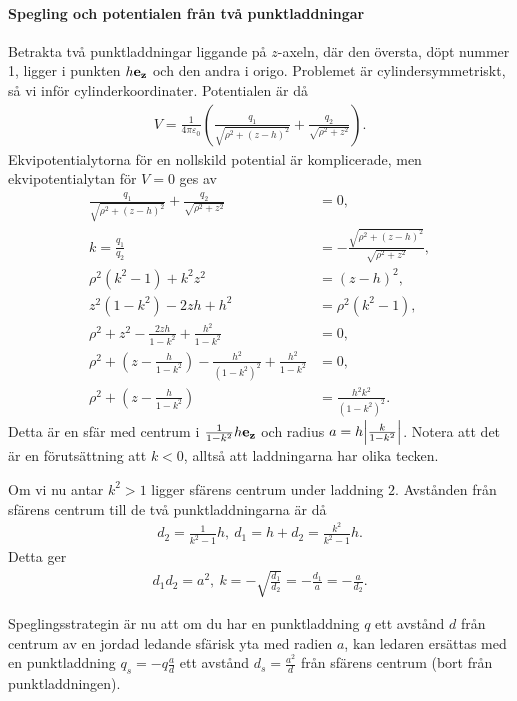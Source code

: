 \paragraph{Spegling och potentialen från två punktladdningar}
Betrakta två punktladdningar liggande på $z$-axeln, där den översta, döpt nummer 1, ligger i punkten $h\vb{e}_{\vb{z}}$ och den andra i origo. Problemet är cylindersymmetriskt, så vi inför cylinderkoordinater. Potentialen är då
\begin{align*}
	V = \frac{1}{4\pi\varepsilon_{0}}\left(\frac{q_{1}}{\sqrt{\rho^{2} + (z - h)^{2}}} + \frac{q_{2}}{\sqrt{\rho^{2} + z^{2}}}\right).
\end{align*}
Ekvipotentialytorna för en nollskild potential är komplicerade, men ekvipotentialytan för $V = 0$ ges av
\begin{align*}
	\frac{q_{1}}{\sqrt{\rho^{2} + (z - h)^{2}}} + \frac{q_{2}}{\sqrt{\rho^{2} + z^{2}}} &= 0, \\
	k = \frac{q_{1}}{q_{2}}                                                             &= -\frac{\sqrt{\rho^{2} + (z - h)^{2}}}{\sqrt{\rho^{2} + z^{2}}}, \\
	\rho^{2}(k^{2} - 1) + k^{2}z^{2}                                                         &= (z - h)^{2}, \\
	z^{2}(1 - k^{2}) - 2zh + h^{2}                                                      &= \rho^{2}(k^{2} - 1), \\
	\rho^{2} + z^{2} - \frac{2zh}{1 - k^{2}} + \frac{h^{2}}{1 - k^{2}}                  &= 0, \\
	\rho^{2} + \left(z - \frac{h}{1 - k^{2}}\right) - \frac{h^{2}}{(1 - k^{2})^{2}} + \frac{h^{2}}{1 - k^{2}} &= 0, \\
	\rho^{2} + \left(z - \frac{h}{1 - k^{2}}\right)                                     &= \frac{h^{2}k^{2}}{(1 - k^{2})^{2}}.
\end{align*}
Detta är en sfär med centrum i $\frac{1}{1 - k^{2}}h\vb{e}_{\vb{z}}$ och radius $a = h\abs{\frac{k}{1 - k^{2}}}$. Notera att det är en förutsättning att $k < 0$, alltså att laddningarna har olika tecken.

Om vi nu antar $k^{2} > 1$ ligger sfärens centrum under laddning $2$. Avstånden från sfärens centrum till de två punktladdningarna är då
\begin{align*}
	d_{2} = \frac{1}{k^{2} - 1}h,\ d_{1} = h + d_{2} = \frac{k^{2}}{k^{2} - 1}h.
\end{align*}
Detta ger
\begin{align*}
	d_{1}d_{2} = a^{2},\ k = -\sqrt{\frac{d_{1}}{d_{2}}} = -\frac{d_{1}}{a} = -\frac{a}{d_{2}}.
\end{align*}

Speglingsstrategin är nu att om du har en punktladdning $q$ ett avstånd $d$ från centrum av en jordad ledande sfärisk yta med radien $a$, kan ledaren ersättas med en punktladdning $q_{s} = -q\frac{a}{d}$ ett avstånd $d_{s} = \frac{a^{2}}{d}$ från sfärens centrum (bort från punktladdningen).